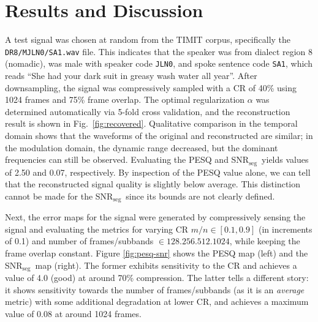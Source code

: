 \documentclass[10pt,a4paper,twoside]{article}
\newcommand{\snrseg}{SNR$_{\mathrm{seg}}$}
\begin{document}
\section{Results and Discussion}
A test signal was chosen at random from the TIMIT corpus, specifically the \texttt{DR8/MJLN0/SA1.wav} file. This indicates that the speaker was from dialect region 8 (nomadic), was male with speaker code \texttt{JLN0}, and spoke sentence code \texttt{SA1}, which reads ``She had your dark suit in greasy wash water all year''. After downsampling, the signal was compressively sampled with a CR of 40\% using 1024 frames and 75\% frame overlap. The optimal regularization $\alpha$ was determined automatically via 5-fold cross validation, and the reconstruction result is shown in Fig.~\ref{fig:recovered}. Qualitative comparison in the temporal domain shows that the waveforms of the original and reconstructed are similar; in the modulation domain, the dynamic range decreased, but the dominant frequencies can still be observed. Evaluating the PESQ and \snrseg~yields values of 2.50 and 0.07, respectively. By inspection of the PESQ value alone, we can tell that the reconstructed signal quality is slightly below average. This distinction cannot be made for the \snrseg~since its bounds are not clearly defined.

Next, the error maps for the signal were generated by compressively sensing the signal and evaluating the metrics for varying CR $m/n \in [0.1, 0.9]$ (in increments of 0.1) and number of frames/subbands $\in \qty{128, 256, 512, 1024}$, while keeping the frame overlap constant. Figure \ref{fig:pesq-snr} shows the PESQ map (left) and the \snrseg~map (right). The former exhibits sensitivity to the CR and achieves a value of 4.0 (good) at around 70\% compression. The latter tells a different story: it shows sensitivity towards the number of frames/subbands (as it is an \textit{average} metric) with some additional degradation at lower CR, and achieves a maximum value of 0.08 at around 1024 frames.
\end{document}
